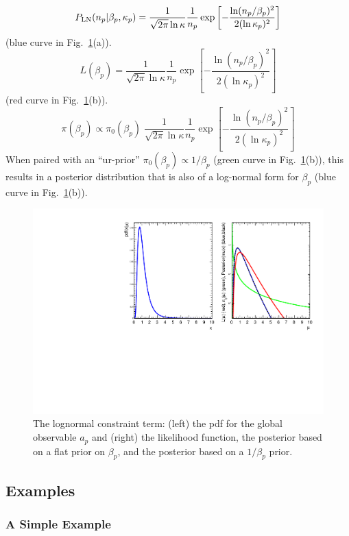 \begin{equation}
\LN(n_p | \beta_p, \kappa_p) = \frac{1}{\sqrt{2\pi}\ln \kappa}\frac{1}{n_p} \exp \left[ -\frac{\ln(n_p/ \beta_p)^2}{2(\ln \kappa_p)^2} \right]
\end{equation}
(blue curve in Fig.~\ref{fig:lognormal}(a)).
\begin{equation}
L( \beta_p) = \frac{1}{\sqrt{2\pi}\ln \kappa}\frac{1}{n_p} \exp \left[ -\frac{\ln(n_p/ \beta_p)^2}{2(\ln \kappa_p)^2} \right]
\end{equation}
(red curve in Fig.~\ref{fig:lognormal}(b)).
\begin{equation}
\pi( \beta_p) \propto \pi_0(\beta_p)  \; \frac{1}{\sqrt{2\pi}\ln \kappa}\frac{1}{n_p} \exp \left[ -\frac{\ln(n_p/ \beta_p)^2}{2(\ln \kappa_p)^2} \right]
\end{equation}
When paired with an ``ur-prior'' $\pi_0(\beta_p) \propto 1/\beta_p$ (green curve in Fig.~\ref{fig:lognormal}(b)), this results in a posterior distribution that is also of a log-normal form for $\beta_p$ (blue curve in Fig.~\ref{fig:lognormal}(b)).



\begin{figure}[htbp]
\begin{center}
\includegraphics[width=.4\textwidth]{figures/histfactory/lognormal}
\caption{The lognormal constraint term: (left) the pdf for the global observable $a_p$ and (right) the likelihood function, the posterior based on a flat prior on $\beta_p$, and the posterior based on a $1/\beta_p$ prior.}
\label{fig:lognormal}
\end{center}
\end{figure}


\newpage

\subsection{Examples}
\subsubsection{A Simple Example}

